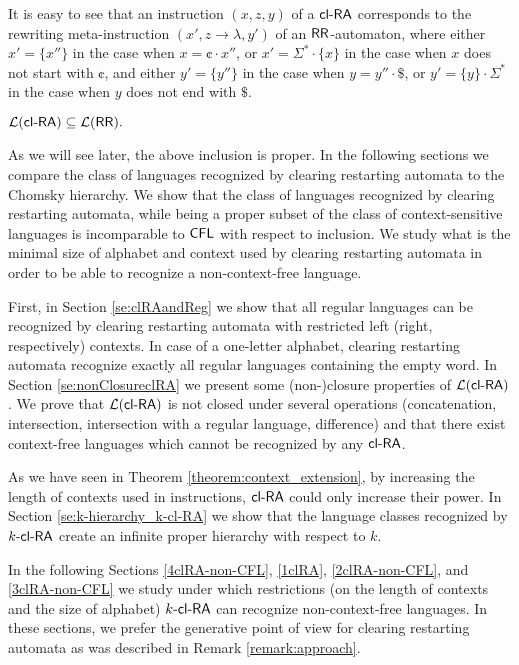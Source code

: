It is easy to see that an instruction $(x,z,y)$ of a $\clRA$ corresponds to the rewriting meta-instruction $(x',z \to \lambda,y')$ of an $\RR$-automaton, where either $x'=\{x''\}$ in the case when $x=\cent \cdot x''$, or $x' = \Sigma^*\cdot \{x\}$ in the case when $x$ does not start with $\cent$, and either $y'=\{y''\}$ in the case when $y=y'' \cdot \$ $, or $y' = \{y\} \cdot \Sigma^* $ in the case when $y$ does not end with $\$ $.

\begin{theorem}\label{theorem:clRAsubseteqRR}
$\calL{\clRA} \subseteq \calL{\RR}.$
\end{theorem}

As we will see later, the above inclusion is proper. In the following sections we compare the class of languages recognized by clearing restarting automata to the Chomsky hierarchy. We show that the class of languages recognized by clearing restarting automata, while being a proper subset of the class of context-sensitive languages is incomparable to $\CFL$ with respect to inclusion. We study what is the minimal size of alphabet and context used by clearing restarting automata in order to be able to recognize a non-context-free language.

First, in Section \ref{se:clRAandReg} we show that all regular languages can be recognized by clearing restarting automata with restricted left (right, respectively) contexts. In case of a one-letter alphabet, clearing restarting automata recognize exactly all regular languages containing the empty word. In Section \ref{se:nonClosureclRA} we present some (non-)closure properties of $\calL{\clRA}$. We prove that $\calL{\clRA}$ is not closed under several operations (concatenation, intersection, intersection with a regular language, difference) and that there exist context-free languages which cannot be recognized by any $\clRA$.

As we have seen in Theorem \ref{theorem:context_extension}, by increasing the length of contexts used in instructions, $\clRA$ could only increase their power. In Section \ref{se:k-hierarchy_k-cl-RA} we show that the language classes recognized by $\kclRA[k]$ create an infinite proper hierarchy with respect to $k$.

In the following Sections \ref{4clRA-non-CFL}, \ref{1clRA}, \ref{2clRA-non-CFL}, and \ref{3clRA-non-CFL} we study under which restrictions (on the length of contexts and the size of alphabet) $\kclRA[k]$ can recognize non-context-free languages. In these sections, we prefer the generative point of view for clearing restarting automata as was described in Remark \ref{remark:approach}.

